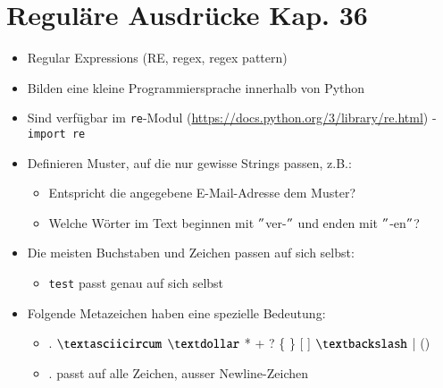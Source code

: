 
\section[Reguläre Ausdrücke]{Reguläre Ausdrücke \tiny{Kap. 36}}
\begin{itemize}
	\item Regular Expressions (RE, regex, regex pattern)
	\item Bilden eine kleine Programmiersprache innerhalb von Python
	\item Sind verfügbar im \texttt{re}-Modul (\url{https://docs.python.org/3/library/re.html}) - \texttt{import re}
	\item Definieren Muster, auf die nur gewisse Strings passen, z.B.:
	\begin{itemize}
		\item Entspricht die angegebene E-Mail-Adresse dem Muster?
		\item Welche Wörter im Text beginnen mit $"$ver-$"$ und enden mit $"$-en$"$?
	\end{itemize}
	\item Die meisten Buchstaben und Zeichen passen auf sich selbst:
	\begin{itemize}
		\item \texttt{test} passt genau auf sich selbst
	\end{itemize}
	\item Folgende Metazeichen haben eine spezielle Bedeutung:
	\begin{itemize}
		\item[\-] . $\textasciicircum$ $\textdollar$ * + ? \{ \} [ ] $\textbackslash$ | ()
		\item[\-] . passt auf alle Zeichen, ausser Newline-Zeichen
	\end{itemize}
\end{itemize}

